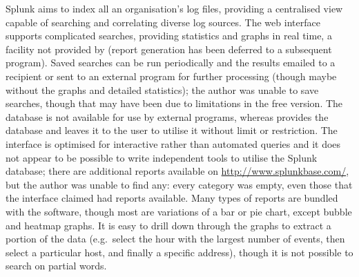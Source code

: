 Splunk aims to index all an organisation's log files, providing a
centralised view capable of searching and correlating diverse log sources.
The web interface supports complicated searches, providing statistics and
graphs in real time, a facility not provided by \parsername{} (report
generation has been deferred to a subsequent program).  Saved searches can
be run periodically and the results emailed to a recipient or sent to an
external program for further processing (though maybe without the graphs
and detailed statistics); the author was unable to save searches, though
that may have been due to limitations in the free version.  The database is
not available for use by external programs, whereas \parsername{} provides
the database and leaves it to the user to utilise it without limit or
restriction.  The interface is optimised for interactive rather than
automated queries and it does not appear to be possible to write
independent tools to utilise the Splunk database; there are additional
reports available on \url{http://www.splunkbase.com/}, but the author was
unable to find any: every category was empty, even those that the interface
claimed had reports available.  Many types of reports are bundled with the
software, though most are variations of a bar or pie chart, except bubble
and heatmap graphs.  It is easy to drill down through the graphs to extract
a portion of the data (e.g.\ select the hour with the largest number of
events, then select a particular host, and finally a specific address),
though it is not possible to search on partial words.

